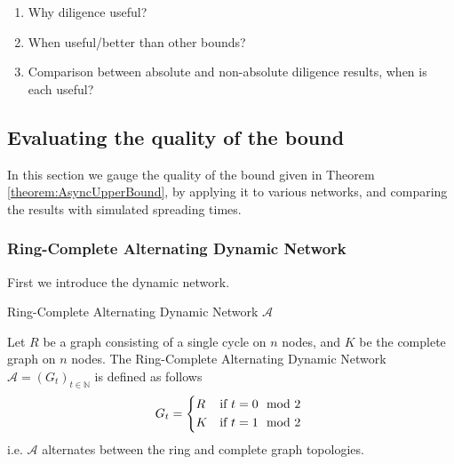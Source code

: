 


 

\begin{enumerate}
	\item Why diligence useful?
	\item When useful/better than other bounds?
	\item Comparison between absolute and non-absolute  diligence results, when is each useful?
\end{enumerate}

\subsection{Evaluating the quality of the bound}

In this section we gauge the quality of the bound given in Theorem \ref{theorem:AsyncUpperBound}, by applying it to various networks, and comparing the results with simulated spreading times.

\subsubsection{Ring-Complete Alternating Dynamic Network}

First we introduce the dynamic network. %

\begin{definition}
	Ring-Complete Alternating Dynamic Network $\mathcal{A}$

	\noindent
	Let $R$ be a graph consisting of a single cycle on $n$ nodes, and $K$ be the complete graph on $n$ nodes. The Ring-Complete Alternating Dynamic Network $\mathcal{A} = (G_t)_{t \in \mathbb{N}}$ is defined as follows %
	\begin{equation*}
		G_t = 
		\begin{cases*}
			R & if $t = 0 \mod 2$ \\
			K & if $t = 1 \mod 2$
		  \end{cases*}
	\end{equation*}
	i.e. $\mathcal{A}$ alternates between the ring and complete graph topologies.
\end{definition}

